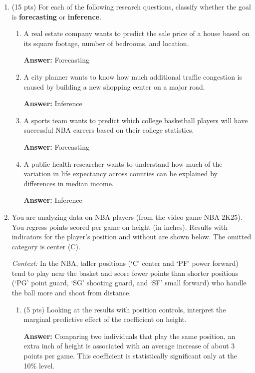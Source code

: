 \documentclass[12pt]{article}
\newcommand{\answer}[1]{{\color{blue_winged_teal}\textbf{Answer:} #1}}
\newcommand{\pts}[1]{{\color{zinc500}(#1 pts)}}
\begin{document}
\begin{enumerate}
    \bigskip
  \item \pts{15} For each of the following research questions, classify whether the goal is \textbf{forecasting} or \textbf{inference}.

    \begin{enumerate}
      \item A real estate company wants to predict the sale price of a house based on its square footage, number of bedrooms, and location.
      
      \answer{Forecasting}

      \item A city planner wants to know how much additional traffic congestion is caused by building a new shopping center on a major road.
      
      \answer{Inference}

      \item A sports team wants to predict which college basketball players will have successful NBA careers based on their college statistics.
      
      \answer{Forecasting}

      \item A public health researcher wants to understand how much of the variation in life expectancy across counties can be explained by differences in median income.
      
      \answer{Inference}
    \end{enumerate}
  \item You are analyzing data on NBA players (from the video game NBA 2K25). You regress points scored per game on height (in inches).
    Results with indicators for the player's position and without are shown below.
    The omitted category is center (C).

    \emph{Context:} In the NBA, taller positions (`C' center and `PF' power forward) tend to play near the basket and score fewer points than shorter positions (`PG' point guard, `SG' shooting guard, and `SF' small forward) who handle the ball more and shoot from distance.

    \begin{enumerate}
      \item \pts{5} Looking at the results with position controls, interpret the marginal predictive effect of the coefficient on height.

      \answer{Comparing two individuals that play the same position, an extra inch of height is associated with an average increase of about 3 points per game. This coefficient is statistically significant only at the 10\% level.}
      

\end{enumerate}
\end{enumerate}
\end{document}
